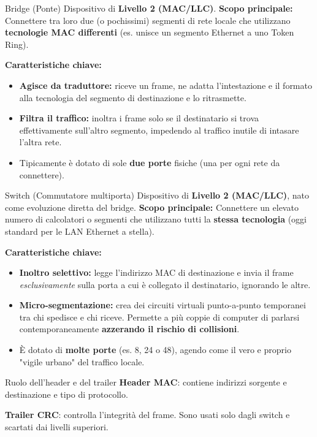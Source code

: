 \documentclass[a4paper,12pt]{report}
\begin{document}
\begin{defbox}{Bridge (Ponte)}
Dispositivo di \textbf{Livello 2 (MAC/LLC)}.  
\textbf{Scopo principale:} Connettere tra loro due (o pochissimi) segmenti di rete locale che utilizzano \textbf{tecnologie MAC differenti} (es. unisce un segmento Ethernet a uno Token Ring).  

\textbf{Caratteristiche chiave:}
\begin{itemize}
    \item \textbf{Agisce da traduttore:} riceve un frame, ne adatta l'intestazione e il formato alla tecnologia del segmento di destinazione e lo ritrasmette.
    \item \textbf{Filtra il traffico:} inoltra i frame solo se il destinatario si trova effettivamente sull'altro segmento, impedendo al traffico inutile di intasare l'altra rete.
    \item Tipicamente è dotato di sole \textbf{due porte} fisiche (una per ogni rete da connettere).
\end{itemize}
\end{defbox}

\begin{defbox}{Switch (Commutatore multiporta)}
Dispositivo di \textbf{Livello 2 (MAC/LLC)}, nato come evoluzione diretta del bridge.  
\textbf{Scopo principale:} Connettere un elevato numero di calcolatori o segmenti che utilizzano tutti la \textbf{stessa tecnologia} (oggi standard per le LAN Ethernet a stella).  

\textbf{Caratteristiche chiave:}
\begin{itemize}
    \item \textbf{Inoltro selettivo:} legge l'indirizzo MAC di destinazione e invia il frame \textit{esclusivamente} sulla porta a cui è collegato il destinatario, ignorando le altre.
    \item \textbf{Micro-segmentazione:} crea dei circuiti virtuali punto-a-punto temporanei tra chi spedisce e chi riceve. Permette a più coppie di computer di parlarsi contemporaneamente \textbf{azzerando il rischio di collisioni}.
    \item È dotato di \textbf{molte porte} (es. 8, 24 o 48), agendo come il vero e proprio "vigile urbano" del traffico locale.
\end{itemize}
\end{defbox}

\begin{notebox}{Ruolo dell’header e del trailer}
\textbf{Header MAC}: contiene indirizzi sorgente e destinazione e tipo di protocollo.

\textbf{Trailer CRC}: controlla l’integrità del frame.
Sono usati solo dagli switch e scartati dai livelli superiori.
\end{notebox}
\end{document}
